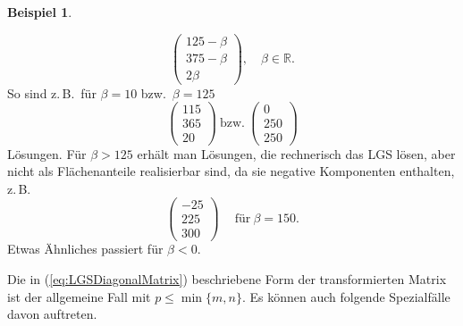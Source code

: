 \documentclass[a4paper,11pt,oneside]{article}
\theoremstyle{definition}
\newtheorem{example}{Beispiel}
\begin{document}
\begin{example}
\begin{enumerate}
\[\begin{pmatrix}125-\beta\\375-\beta\\2\beta\end{pmatrix},\quad \beta\in\mathbb R.
\]
So sind z.\,B.\ für $\beta=10$ bzw.\ $\beta=125$
\[
\begin{pmatrix}115\\365\\20\end{pmatrix} ~\text{bzw.}~ \begin{pmatrix}0\\250\\250\end{pmatrix}
\]
Lösungen. Für $\beta>125$ erhält man Lösungen, die rechnerisch das LGS lösen, aber nicht als Flächenanteile realisierbar sind, da sie negative Komponenten enthalten, z.\,B.
\[
\begin{pmatrix}-25\\225\\300\end{pmatrix} \quad ~\text{für}~ \beta=150.
\]
Etwas Ähnliches passiert für $\beta<0$.
\end{enumerate}
\end{example}

Die in (\ref{eq:LGSDiagonalMatrix}) beschriebene Form der transformierten Matrix ist der allgemeine Fall mit $p\le\min\{m,n\}$. Es können auch folgende Spezialfälle davon auftreten.
\end{document}
